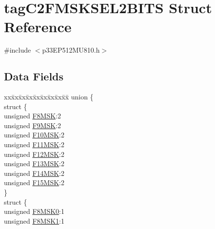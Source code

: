 \hypertarget{structtag_c2_f_m_s_k_s_e_l2_b_i_t_s}{}\section{tag\+C2\+F\+M\+S\+K\+S\+E\+L2\+B\+I\+TS Struct Reference}
\label{structtag_c2_f_m_s_k_s_e_l2_b_i_t_s}


{\ttfamily \#include $<$p33\+E\+P512\+M\+U810.\+h$>$}

\subsection*{Data Fields}
\begin{DoxyCompactItemize}
\item 
\begin{tabbing}
xx\=xx\=xx\=xx\=xx\=xx\=xx\=xx\=xx\=\kill
union \{\\
\>struct \{\\
\>\>unsigned \hyperlink{structtag_c2_f_m_s_k_s_e_l2_b_i_t_s_aa385ebcf1c8887c3e813c9394311e258}{F8MSK}:2\\
\>\>unsigned \hyperlink{structtag_c2_f_m_s_k_s_e_l2_b_i_t_s_acd8b308dcee4c6a8ed0b741d9c8885a6}{F9MSK}:2\\
\>\>unsigned \hyperlink{structtag_c2_f_m_s_k_s_e_l2_b_i_t_s_ac85d207fdb98bcc241aef184226ab69f}{F10MSK}:2\\
\>\>unsigned \hyperlink{structtag_c2_f_m_s_k_s_e_l2_b_i_t_s_a26ca4276523f92fbcf6d68dd671840a2}{F11MSK}:2\\
\>\>unsigned \hyperlink{structtag_c2_f_m_s_k_s_e_l2_b_i_t_s_a332d4c499e1dc1081b68491c6d3fb583}{F12MSK}:2\\
\>\>unsigned \hyperlink{structtag_c2_f_m_s_k_s_e_l2_b_i_t_s_a81818c6979fc8facecfa97b854f79cb4}{F13MSK}:2\\
\>\>unsigned \hyperlink{structtag_c2_f_m_s_k_s_e_l2_b_i_t_s_a156146a47054ef86b796752535b8720e}{F14MSK}:2\\
\>\>unsigned \hyperlink{structtag_c2_f_m_s_k_s_e_l2_b_i_t_s_a4ea2a06f2eab2449eea6dcd55cbecb84}{F15MSK}:2\\
\>\} \\
\>struct \{\\
\>\>unsigned \hyperlink{structtag_c2_f_m_s_k_s_e_l2_b_i_t_s_abaf758e2c2d3d535fe7fd6263a36e965}{F8MSK0}:1\\
\>\>unsigned \hyperlink{structtag_c2_f_m_s_k_s_e_l2_b_i_t_s_a50105813baa614d18a472ba0fd6c1484}{F8MSK1}:1\\

\end{tabbing}
\end{DoxyCompactItemize}
